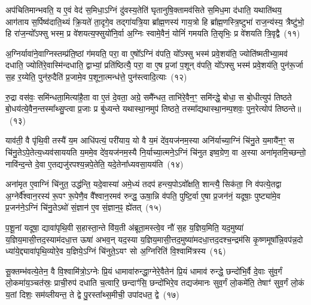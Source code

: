 अप॑चितिमान्भवति॒ य ए॒वं वेद॑ स॒मिधा॒\-ऽग्निं दु॑वस्य॒तेति॑ घृतानुषि॒क्तामव॑सिते स॒मिध॒मा द॑धाति॒ यथाति॑थय॒ आग॑ताय स॒र्पिष्व॑दाति॒थ्यं क्रि॒यते॑ ता॒दृगे॒व तद्गा॑यत्रि॒या ब्रा᳚ह्म॒णस्य॑ गाय॒त्रो हि ब्रा᳚ह्म॒णस्त्रि॒ष्टुभा॑ राज॒न्य॑स्य॒ त्रैष्टु॑भो॒ हि रा॑ज॒न्यो᳚\-ऽफ्सु भस्म॒ प्र वे॑शयत्य॒फ्सुयो॑नि॒र्वा अ॒ग्निः स्वामे॒वैनं॒ योनिं॑ गमयति ति॒सृभिः॒ प्र वे॑शयति त्रि॒वृद्वै~(११)

अ॒ग्निर्यावा॑ने॒वाग्निस्तम्प्र॑ति॒ष्ठां ग॑मयति॒ परा॒ वा ए॒षो᳚\-ऽग्निं व॑पति॒ यो᳚\-ऽफ्सु भस्म॑ प्रवे॒शय॑ति॒ ज्योति॑ष्मतीभ्या॒मव॑ दधाति॒ ज्योति॑रे॒वास्मि॑न्दधाति॒ द्वाभ्यां॒ प्रति॑ष्ठित्यै॒ परा॒ वा ए॒ष प्र॒जां प॒शून् व॑पति॒ यो᳚\-ऽफ्सु भस्म॑ प्रवे॒शय॑ति॒ पुन॑रू॒र्जा स॒ह र॒य्येति॒ पुन॑रु॒दैति॑ प्र॒जामे॒व प॒शूना॒त्मन्ध॑त्ते॒ पुन॑स्त्वादि॒त्याः~(१२)

रु॒द्रा वस॑वः॒ समि॑न्धता॒मित्या॑है॒ता वा ए॒तं दे॒वता॒ अग्रे॒ समै᳚न्धत॒ ताभि॑रे॒वैन॒ꣳ॒ समि॑न्द्धे॒ बोधा॒ स बो॒धीत्युप॑ तिष्ठते बो॒धय॑त्ये॒वैन॒न्तस्मा᳚थ्सु॒प्त्वा प्र॒जाः प्र बु॑ध्यन्ते यथास्था॒नमुप॑ तिष्ठते॒ तस्मा᳚द्यथास्था॒नम्प॒शवः॒ पुन॒रेत्योप॑ तिष्ठन्ते॥~(१३)

{}%

याव॑ती॒ वै पृ॑थि॒वी तस्यै॑ य॒म आधि॑पत्यं॒ परी॑याय॒ यो वै य॒मं दे॑व॒यज॑नम॒स्या अनि॑र्याच्या॒ग्निं चि॑नु॒ते य॒मायै॑न॒ꣳ॒ स चि॑नु॒ते\-ऽपे॒तेत्य॒ध्यव॑साययति य॒ममे॒व दे॑व॒यज॑नम॒स्यै नि॒र्याच्या॒त्मने॒\-ऽग्निं चि॑नुत इष्व॒ग्रेण॒ वा अ॒स्या अना॑मृतमि॒च्छन्तो॒ नावि॑न्द॒न्ते दे॒वा ए॒तद्यजु॑रपश्य॒न्नपे॒तेति॒ यदे॒तेना᳚ध्यवसा॒यय॑ति~(१४)

अना॑मृत ए॒वाग्निं चि॑नुत॒ उद्ध॑न्ति॒ यदे॒वास्या॑ अमे॒ध्यं तदप॑ हन्त्य॒पो\-ऽवो᳚क्षति॒ शान्त्यै॒ सिक॑ता॒ नि व॑पत्ये॒तद्वा अ॒ग्नेर्वै᳚श्वान॒रस्य॑ रू॒पꣳ रू॒पेणै॒व वै᳚श्वान॒रमव॑ रुन्द्ध॒ ऊषा॒न्नि व॑पति॒ पुष्टि॒र्वा ए॒षा प्र॒जन॑नं॒ यदूषाः॒ पुष्ट्या॑मे॒व प्र॒जन॑ने॒\-ऽग्निं चि॑नु॒ते\-ऽथो॑ सं॒ज्ञान॑ ए॒व सं॒ज्ञान॒ꣴ॒ ह्ये॑तत्~(१५)

प॒शू॒नां यदूषा॒ द्यावा॑पृथि॒वी स॒हास्ता॒न्ते वि॑य॒ती अ॑ब्रूता॒मस्त्वे॒व नौ॑ स॒ह य॒ज्ञिय॒मिति॒ यद॒मुष्या॑ य॒ज्ञिय॒मासी॒त्तद॒स्याम॑दधा॒त्त ऊषा॑ अभव॒न् यद॒स्या य॒ज्ञिय॒मासी॒त्तद॒मुष्या॑मदधा॒त्तद॒दश्च॒न्द्रम॑सि कृ॒ष्णमूषा᳚न्नि॒वप॑न्न॒दो ध्या॑ये॒द्द्यावा॑पृथि॒व्योरे॒व य॒ज्ञिये॒\-ऽग्निं चि॑नुते॒\-ऽयꣳ सो अ॒ग्निरिति॑ वि॒श्वामि॑त्रस्य~(१६)

सू॒क्तम्भ॑वत्ये॒तेन॒ वै वि॒श्वामि॑त्रो॒\-ऽग्नेः प्रि॒यं धामावा॑रुन्द्धा॒ग्नेरे॒वैतेन॑ प्रि॒यं धामाव॑ रुन्द्धे॒ छन्दो॑भि॒र्वै दे॒वाः सु॑व॒र्गं लो॒कमा॑य॒ञ्चत॑स्रः॒ प्राची॒रुप॑ दधाति च॒त्वारि॒ छन्दाꣳ॑सि॒ छन्दो॑भिरे॒व तद्यज॑मानः सुव॒र्गं लो॒कमे॑ति॒ तेषाꣳ॑ सुव॒र्गं लो॒कं य॒तां दिशः॒ सम॑व्लीयन्त॒ ते द्वे पु॒रस्ता᳚थ्स॒मीची॒ उपा॑दधत॒ द्वे~(१७)

